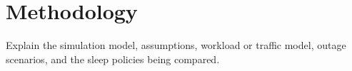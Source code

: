 \section{Methodology}

Explain the simulation model, assumptions, workload or traffic model, outage
scenarios, and the sleep policies being compared.
